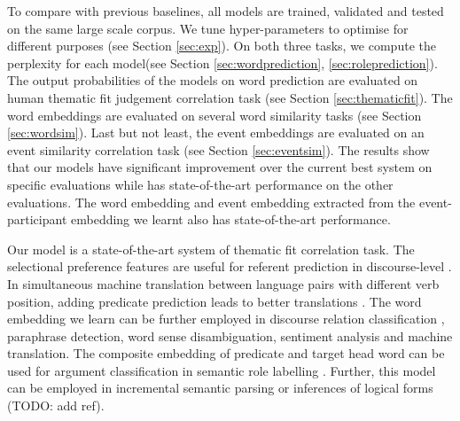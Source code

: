 \documentclass[a4paper]{article}
\begin{document}
To compare with previous baselines, all models are trained, validated and tested on the same large scale corpus. We tune hyper-parameters to optimise for different purposes (see Section \ref{sec:exp}). On both three tasks, we compute the perplexity for each model(see Section \ref{sec:wordprediction}, \ref{sec:roleprediction}). The output probabilities of the models on word prediction are evaluated on human thematic fit judgement correlation task (see Section \ref{sec:thematicfit}). The word embeddings are evaluated on several word similarity tasks (see Section \ref{sec:wordsim}). Last but not least, the event embeddings are evaluated on an event similarity correlation task (see Section \ref{sec:eventsim}). The results show that our models have significant improvement over the current best system on specific evaluations while has state-of-the-art performance on the other evaluations. The word embedding and event embedding extracted from the event-participant embedding we learnt also has state-of-the-art performance. 
% 
% 
% 
%
% 
%

Our model is a state-of-the-art system of thematic fit correlation task. The selectional preference features are useful for referent prediction in discourse-level \citep{modi2017modeling}. In simultaneous machine translation between language pairs with different verb position, adding predicate prediction leads to better translations \citep{grissom2014don}. The word embedding we learn can be further employed in discourse relation classification \citep{shi2017need, rutherford2017systematic}, paraphrase detection, word sense disambiguation, sentiment analysis and machine translation. The composite embedding of predicate and target head word can be used for argument classification in semantic role labelling \citep{roth2016neural}. Further, this model can be employed in incremental semantic parsing \citep{konstas2014incremental, konstas2015semantic} or inferences of logical forms (TODO: add ref). 
\end{document}
